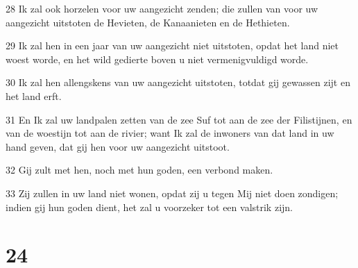 \par 28 Ik zal ook horzelen voor uw aangezicht zenden; die zullen van voor uw aangezicht uitstoten de Hevieten, de Kanaanieten en de Hethieten.
\par 29 Ik zal hen in een jaar van uw aangezicht niet uitstoten, opdat het land niet woest worde, en het wild gedierte boven u niet vermenigvuldigd worde.
\par 30 Ik zal hen allengskens van uw aangezicht uitstoten, totdat gij gewassen zijt en het land erft.
\par 31 En Ik zal uw landpalen zetten van de zee Suf tot aan de zee der Filistijnen, en van de woestijn tot aan de rivier; want Ik zal de inwoners van dat land in uw hand geven, dat gij hen voor uw aangezicht uitstoot.
\par 32 Gij zult met hen, noch met hun goden, een verbond maken.
\par 33 Zij zullen in uw land niet wonen, opdat zij u tegen Mij niet doen zondigen; indien gij hun goden dient, het zal u voorzeker tot een valstrik zijn.

\chapter{24}

